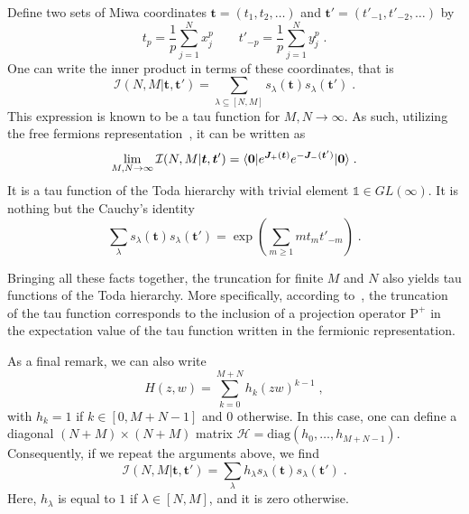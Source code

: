 \documentclass[a4paper,11pt]{amsart}
\begin{document}
Define two sets of Miwa coordinates \(\bm{t} = (t_1, t_2, \dots)\) and
\(\bm{t}' = (t'_{-1}, t'_{-2}, \dots)\) by
\begin{equation}
  t_p = \frac{1}{p}\sum_{j=1}^N x_j^p\qquad 
  t'_{-p} = \frac{1}{p}\sum_{j=1}^N y_j^p\; .
\end{equation}
One can write the inner product in terms of these coordinates, that is
\begin{equation}
  \mathcal{I}(N, M|\bm{t}, \bm{t}') = \sum_{\lambda\subseteq [N,M]} s_\lambda(\bm{t}) s_\lambda(\bm{t}') \; .
\end{equation}
This expression is known to be a tau function for \(M, N\to \infty\).
As such, utilizing the free fermions representation~\cite{Alexandrov:2012tr}, it can be written as
\begin{equation}
  \lim_{M,N\to \infty}\mathcal{I}(N, M|\bm{t}, \bm{t}')
 = \langle\bm{0}\rvert e^{\bm{J}_+(\bm{t})} e^{-\bm{J}_-(\bm{t}')} \lvert\bm{0}\rangle\; .
\end{equation}
It is a tau function of the Toda hierarchy with trivial element \(\mathbb{1} \in GL(\infty)\).
It is nothing but the Cauchy's identity
\begin{equation}
  \sum_{\lambda } s_{\lambda}(\bm{t}) s_{\lambda}(\bm{t}')
    = \exp \left( \sum_{m\geq1} m t_m t'_{-m} \right) \; .
\end{equation}

Bringing all these facts together, the truncation for finite \(M\) and
\(N\) also yields tau functions of the Toda hierarchy. More
specifically, according to~\cite{Alexandrov:2012tr, Kharchev:1991gd,
  Zabrodin:2010ii}, the truncation of the tau function corresponds to
the inclusion of a projection operator \(\mathrm{P}^+\) in the
expectation value of the tau function written in the fermionic
representation.

As a final remark, we can also write
\begin{equation}
  H(z,w) = \sum_{k=0}^{M+N} h_k(zw)^{k-1} \; , 
\end{equation}
with \(h_k=1\) if \(k\in [0, M+N-1]\) and \(0\) otherwise. In this
case, one can define a diagonal \((N+M)\times (N+M)\) matrix
\(\mathcal{H} = \textrm{diag}(h_0, \dots, h_{M+N-1})\). Consequently,
if we repeat the arguments above, we find
\begin{equation}
\mathcal{I}(N, M|\bm{t}, \bm{t}') = \sum_{\lambda} h_\lambda s_\lambda(\bm{t}) s_\lambda(\bm{t}') \; .
\end{equation}
Here, \(h_\lambda\) is equal to \(1\) if \(\lambda \in [N,M]\), and it
is zero otherwise.
\end{document}
